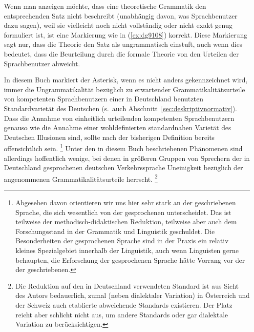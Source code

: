 \begin{exe}
  \ex\label{ex:grammi2types}
  \begin{xlist}
  \end{xlist}
\end{exe}

Wenn man anzeigen möchte, dass eine theoretische Grammatik den entsprechenden Satz nicht beschreibt (unabhängig davon, was Sprachbenutzer dazu sagen), weil sie vielleicht noch nicht vollständig oder nicht exakt genug formuliert ist, ist eine Markierung wie in (\ref{ex:dg9108}) korrekt.
Diese Markierung sagt nur, dass die Theorie den Satz als ungrammatisch einstuft, auch wenn dies bedeutet, dass die Beurteilung durch die formale Theorie von den Urteilen der Sprachbenutzer abweicht.

\begin{exe}
\end{exe}

In diesem Buch markiert der Asterisk, wenn es nicht anders gekennzeichnet wird, immer die Ungrammatikalität bezüglich zu erwartender Grammatikalitätsurteile von kompetenten Sprachbenutzern einer in Deutschland benutzten Standardvarietät des Deutschen (s.\ auch Abschnitt~\ref{sec:deskriptivnormativ}).
Dass die Annahme von einheitlich urteilenden kompetenten Sprachbenutzern genauso wie die Annahme einer wohldefinierten standardnahen Varietät des Deutschen Illusionen sind, sollte nach der bisherigen Definition bereits offensichtlich sein.%
\footnote{Abgesehen davon orientieren wir uns hier sehr stark an der geschriebenen Sprache, die sich wesentlich von der gesprochenen unterscheidet.
Das ist teilweise der methodisch-didaktischen Reduktion, teilweise aber auch dem Forschungsstand in der Grammatik und Linguistik geschuldet.
Die Besonderheiten der gesprochenen Sprache sind in der Praxis ein relativ kleines Spezialgebiet innerhalb der Linguistik, auch wenn Linguisten gerne behaupten, die Erforschung der gesprochenen Sprache hätte Vorrang vor der der geschriebenen.}
Unter den in diesem Buch beschriebenen Phänomenen sind allerdings hoffentlich wenige, bei denen in größeren Gruppen von Sprechern der in Deutschland gesprochenen deutschen Verkehrssprache Uneinigkeit bezüglich der angenommenen Grammatikalitätsurteile herrscht.%
\footnote{Die Reduktion auf den in Deutschland verwendeten Standard ist aus Sicht des Autors bedauerlich, zumal (neben dialektaler Variation) in Österreich und der Schweiz auch etablierte abweichende Standards existieren.
Der Platz reicht aber schlicht nicht aus, um andere Standards oder gar dialektale Variation zu berücksichtigen.}

